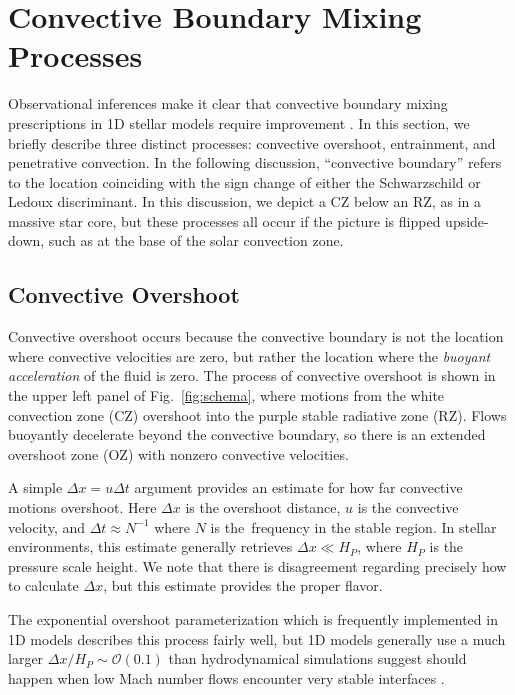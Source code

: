\section{Convective Boundary Mixing Processes}
\label{sec:processes}

Observational inferences make it clear that convective boundary mixing prescriptions in 1D stellar models require improvement \citep{pinsonneault_1997, claret_torres_2018, pedersen_etal_2021}.
In this section, we briefly describe three distinct processes: convective overshoot, entrainment, and penetrative convection.
In the following discussion, ``convective boundary'' refers to the location coinciding with the sign change of either the Schwarzschild or Ledoux discriminant.
In this discussion, we depict a CZ below an RZ, as in a massive star core, but these processes all occur if the picture is flipped upside-down, such as at the base of the solar convection zone.

\subsection{Convective Overshoot}
Convective overshoot occurs because the convective boundary is not the location where convective velocities are zero, but rather the location where the \emph{buoyant acceleration} of the fluid is zero.
The process of convective overshoot is shown in the upper left panel of Fig.~\ref{fig:schema}, where motions from the white convection zone (CZ) overshoot into the purple stable radiative zone (RZ).
Flows buoyantly decelerate beyond the convective boundary, so there is an extended overshoot zone (OZ) with nonzero convective velocities.

A simple $\Delta x = u \Delta t$ argument provides an estimate for how far convective motions overshoot.
Here $\Delta x$ is the overshoot distance, $u$ is the convective velocity, and $\Delta t \approx N^{-1}$ where $N$ is the \brunt$\,$frequency in the stable region.
In stellar environments, this estimate generally retrieves $\Delta x \ll H_P$, where $H_P$ is the pressure scale height.
We note that there is disagreement regarding precisely how to calculate $\Delta x$, but this estimate provides the proper flavor.

The exponential overshoot parameterization \citep[per e.g.,][]{herwig_2000} which is frequently implemented in 1D models describes this process fairly well, but 1D models generally use a much larger $\Delta x/H_P \sim \mathcal{O}(0.1)$ than hydrodynamical simulations suggest should happen when low Mach number flows encounter very stable interfaces \citep{korre_etal_2019}.

